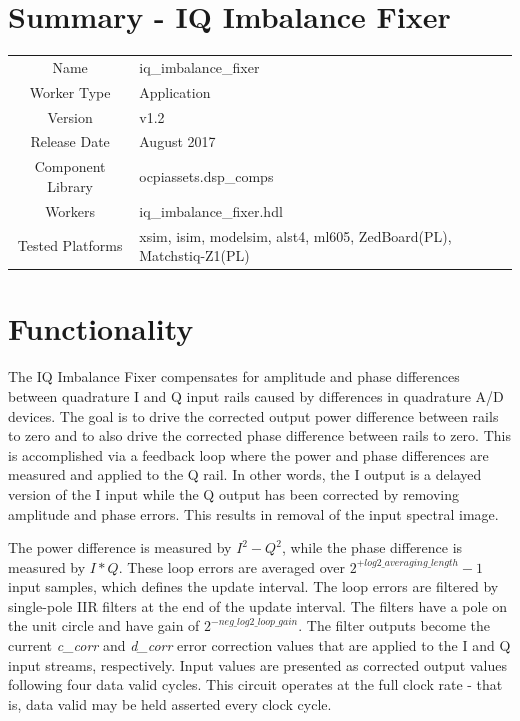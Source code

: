 \documentclass{article}
\author{} %
\date{Version \docVersion} %
\title{\docTitle}
\def\docVersion{1.2}
\def\comp{iq\_imbalance\_fixer}
\def\Comp{IQ Imbalance Fixer}
\begin{document}
\section*{Summary - \Comp}
\begin{tabular}{|c|M{13.5cm}|}
	\hline
	                  &                                                              \\
	\hline
	Name              & \comp                                                        \\
	\hline
	Worker Type       & Application                                                  \\
	\hline
	Version           & v\docVersion \\
	\hline
	Release Date      & August 2017 \\
	\hline
	Component Library & ocpiassets.dsp\_comps                                        \\
	\hline
	Workers           & \comp.hdl                                                    \\
	\hline
	Tested Platforms  & xsim, isim, modelsim, alst4, ml605, ZedBoard(PL), Matchstiq-Z1(PL) \\
	\hline
\end{tabular}\section*{Functionality}
\begin{flushleft}
	The IQ Imbalance Fixer compensates for amplitude and phase differences between quadrature I and Q input rails caused by differences in quadrature A/D devices. The goal is to drive the corrected output power difference between rails to zero and to also drive the corrected phase difference between rails to zero. This is accomplished via a feedback loop where the power and phase differences are measured and applied to the Q rail. In other words, the I output is a delayed version of the I input while the Q output has been corrected by removing amplitude and phase errors. This results in removal of the input spectral image.\medskip

	The power difference is measured by $I^2 - Q^2$, while the phase difference is measured by $I*Q$. These loop errors are averaged over $2^{+log2\_averaging\_length}-1$ input samples, which defines the update interval. The loop errors are filtered by single-pole IIR filters at the end of the update interval. The filters have a pole on the unit circle and have gain of $2^{-neg\_log2\_loop\_gain}$. The filter outputs become the current \textit{c\_corr} and \textit{d\_corr} error correction values that are applied to the I and Q input streams, respectively. Input values are presented as corrected output values following four data valid cycles. This circuit operates at the full clock rate - that is, data valid may be held asserted every clock cycle.\medskip
\end{flushleft}
\end{document}
